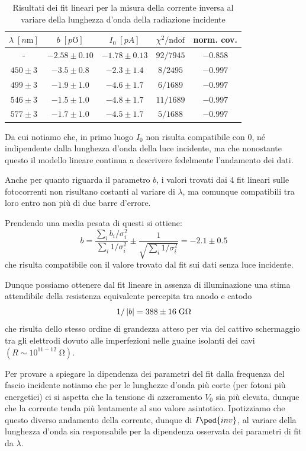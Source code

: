 \documentclass[10pt, a4paper, italian]{article}
\begin{document}
\begin{table}
\centering
\begin{tabular}{ccccc}
\toprule
$\lambda \; [\si{n\m}]$ & $b \; [\si{p\mho}]$ & $I_0 \; [\si{pA}]$ &
$\chi^2/\text{ndof}$ & norm. cov. \\
\midrule
- &  $-2.58 \pm 0.10$ & $-1.78 \pm 0.13$ & $92/7945$ & $-0.858$ \\
$450 \pm 3$ & $-3.5 \pm 0.8$ & $-2.3 \pm 1.4$ & $8/2495$ & $-0.997$ \\
$499 \pm 3$ & $-1.9 \pm 1.0$ & $-4.6 \pm 1.7$ & $6/1689$ & $-0.997$ \\
$546 \pm 3$ & $-1.5 \pm 1.0$ & $-4.8 \pm 1.7$ & $11/1689$ & $-0.997$ \\
$577 \pm 3$ & $-1.7 \pm 1.0$ & $-4.5 \pm 1.7$ & $5/1688$ & $-0.997$ \\
\bottomrule
\end{tabular}
\caption{Risultati dei fit lineari per la misura della corrente inversa
al variare della lunghezza d'onda della radiazione incidente
\label{tab: Invfit}}
\end{table}

Da cui notiamo che, in primo luogo $I_0$ non risulta compatibile con $0$, né
indipendente dalla lunghezza d'onda della luce incidente, ma che nonostante
questo il modello lineare continua a descrivere fedelmente l'andamento dei
dati.

Anche per quanto riguarda il parametro $b$, i valori trovati dai 4 fit lineari
sulle fotocorrenti non risultano costanti al variare di $\lambda$, ma comunque
compatibili tra loro entro non più di due barre d'errore.

Prendendo una media pesata di questi si ottiene:
\begin{equation}\label{eq: bweight}
b = \frac{\sum_i b_i/\sigma_i^2}{\sum_i 1/\sigma_i^2} \pm
\frac{1}{\sqrt{\sum_i 1/\sigma_i^2}} = -2.1 \pm 0.5
\end{equation}
che risulta compatibile con il valore trovato dal fit sui dati senza luce
incidente.

Dunque possiamo ottenere dal fit lineare in assenza di illuminazione una stima
attendibile della resistenza equivalente percepita tra anodo e catodo
\[
1/\abs{b} = 388 \pm 16 \; \si{G\ohm}
\]
che risulta dello stesso ordine di grandezza atteso per via del cattivo
schermaggio tra gli elettrodi dovuto alle imperfezioni nelle guaine isolanti
dei cavi $(R \sim 10^{11-12} \; \si{\ohm})$.

Per provare a spiegare la dipendenza dei parametri del fit dalla frequenza
del fascio incidente notiamo che per le lunghezze d'onda più corte (per
fotoni più energetici) ci si aspetta che la tensione di azzeramento $V_0$ sia
più elevata, dunque che la corrente tenda più lentamente al suo valore
asintotico. Ipotizziamo che questo diverso andamento della corrente, dunque di
$I\ped{inv}$, al variare della lunghezza d'onda sia responsabile per la
dipendenza osservata dei parametri di fit da $\lambda$.
\end{document}
